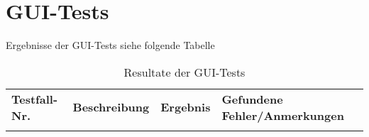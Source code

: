 \section{GUI-Tests}

Ergebnisse der GUI-Tests siehe folgende Tabelle

\begin{landscape}

\begin{longtable}{lp{8cm}lp{10cm}}
\label{typesystemdef} \\
\caption{Resultate der GUI-Tests} \\
\toprule
\textbf{Testfall-Nr.} & \textbf{Beschreibung} & \textbf{Ergebnis} & \textbf{Gefundene Fehler/Anmerkungen} \\
\midrule
\midrule

\endhead

\endfoot


\end{longtable}
\end{landscape}
